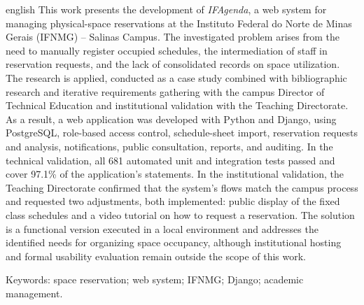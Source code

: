 \documentclass[
	12pt,				%
	oneside,			%
	a4paper,			%
	chapter=TITLE,		%
	section=TITLE,		%
	subsection=TITLE,	%
	subsubsection=TITLE,%
	english,			%
	french,				%
	spanish,			%
	brazil,				%
	]{abntex2}
\begin{document}
\begin{resumo}[Abstract]
    \begin{otherlanguage*}{english}
This work presents the development of \textit{IFAgenda}, a web system for managing physical-space reservations at the Instituto Federal do Norte de Minas Gerais (IFNMG) -- Salinas Campus. The investigated problem arises from the need to manually register occupied schedules, the intermediation of staff in reservation requests, and the lack of consolidated records on space utilization. The research is applied, conducted as a case study combined with bibliographic research and iterative requirements gathering with the campus Director of Technical Education and institutional validation with the Teaching Directorate. As a result, a web application was developed with Python and Django, using PostgreSQL, role-based access control, schedule-sheet import, reservation requests and analysis, notifications, public consultation, reports, and auditing. In the technical validation, all 681 automated unit and integration tests passed and cover 97.1\% of the application's statements. In the institutional validation, the Teaching Directorate confirmed that the system's flows match the campus process and requested two adjustments, both implemented: public display of the fixed class schedules and a video tutorial on how to request a reservation. The solution is a functional version executed in a local environment and addresses the identified needs for organizing space occupancy, although institutional hosting and formal usability evaluation remain outside the scope of this work.

Keywords: space reservation; web system; IFNMG; Django; academic management.
    \end{otherlanguage*}
\end{resumo}

\listoffigures*
\clearpage

\listoftables*
\clearpage


\clearpage

\tableofcontents*
\clearpage


\textual
\end{document}
